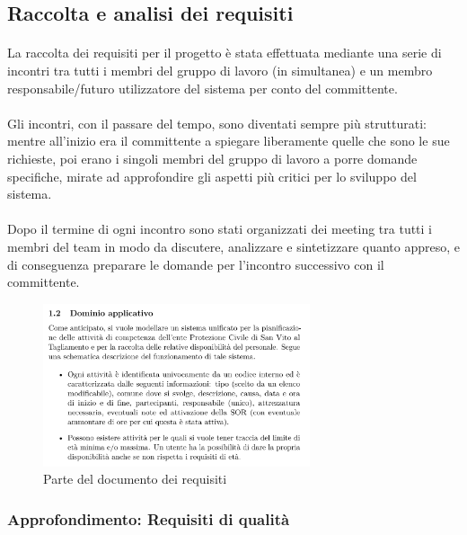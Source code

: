 \documentclass[11pt,a4paper,english]{article}
\begin{document}
\subsection{Raccolta e analisi dei requisiti}

\paragraph{} La raccolta dei requisiti per il progetto è stata effettuata mediante una serie di incontri tra tutti i membri del gruppo di lavoro (in simultanea) e un membro responsabile/futuro utilizzatore del sistema per conto del committente. 

\paragraph{} Gli incontri, con il passare del tempo, sono diventati sempre più strutturati: mentre all'inizio era il committente a spiegare liberamente quelle che sono le sue richieste, poi erano i singoli membri del gruppo di lavoro a porre domande specifiche, mirate ad approfondire gli aspetti più critici per lo sviluppo del sistema. 

\paragraph{} Dopo il termine di ogni incontro sono stati organizzati dei meeting tra tutti i membri del team in modo da discutere, analizzare e sintetizzare quanto appreso, e di conseguenza preparare le domande per l'incontro successivo con il committente.


\begin{figure}[H]
    \centering
    \includegraphics[width=0.7\textwidth]{img/requisiti_dominio.pdf}
    \caption{Parte del documento dei requisiti}
\end{figure}



\subsubsection{Approfondimento: Requisiti di qualità}
\end{document}
